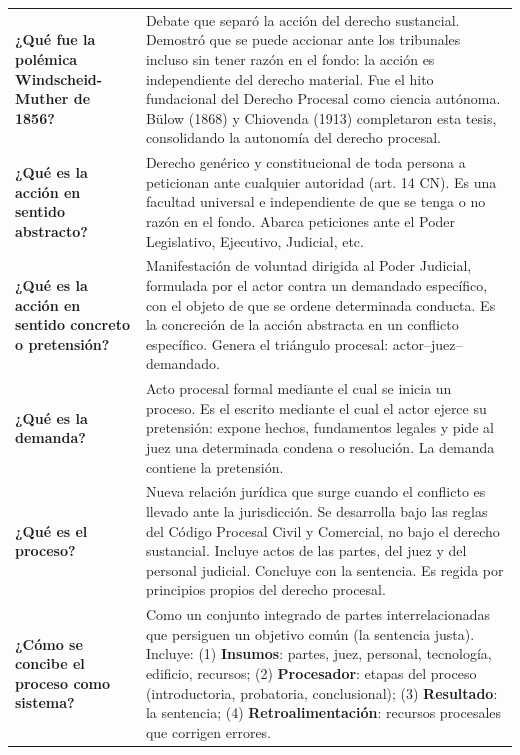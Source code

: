 \documentclass[12pt,oneside]{book}
\begin{document}
\begin{table}[H]
\begin{tabularx}{\textwidth}{
    >{\raggedright\arraybackslash}p{}
    >{\raggedright\arraybackslash}X
}
\textbf{¿Qué fue la polémica Windscheid-Muther de 1856?} &
Debate que separó la acción del derecho sustancial. Demostró que se puede accionar ante los tribunales incluso sin tener razón en el fondo: la acción es independiente del derecho material. Fue el hito fundacional del Derecho Procesal como ciencia autónoma. Bülow (1868) y Chiovenda (1913) completaron esta tesis, consolidando la autonomía del derecho procesal. \\

\textbf{¿Qué es la acción en sentido abstracto?} &
Derecho genérico y constitucional de toda persona a peticionan ante cualquier autoridad (art. 14 CN). Es una facultad universal e independiente de que se tenga o no razón en el fondo. Abarca peticiones ante el Poder Legislativo, Ejecutivo, Judicial, etc. \\

\textbf{¿Qué es la acción en sentido concreto o pretensión?} &
Manifestación de voluntad dirigida al Poder Judicial, formulada por el actor contra un demandado específico, con el objeto de que se ordene determinada conducta. Es la concreción de la acción abstracta en un conflicto específico. Genera el triángulo procesal: actor–juez–demandado. \\

\textbf{¿Qué es la demanda?} &
Acto procesal formal mediante el cual se inicia un proceso. Es el escrito mediante el cual el actor ejerce su pretensión: expone hechos, fundamentos legales y pide al juez una determinada condena o resolución. La demanda contiene la pretensión. \\

\textbf{¿Qué es el proceso?} &
Nueva relación jurídica que surge cuando el conflicto es llevado ante la jurisdicción. Se desarrolla bajo las reglas del Código Procesal Civil y Comercial, no bajo el derecho sustancial. Incluye actos de las partes, del juez y del personal judicial. Concluye con la sentencia. Es regida por principios propios del derecho procesal. \\

\textbf{¿Cómo se concibe el proceso como sistema?} &
Como un conjunto integrado de partes interrelacionadas que persiguen un objetivo común (la sentencia justa). Incluye: (1) \textbf{Insumos}: partes, juez, personal, tecnología, edificio, recursos; (2) \textbf{Procesador}: etapas del proceso (introductoria, probatoria, conclusional); (3) \textbf{Resultado}: la sentencia; (4) \textbf{Retroalimentación}: recursos procesales que corrigen errores. \\


\end{tabularx}
\end{table}
\end{document}
